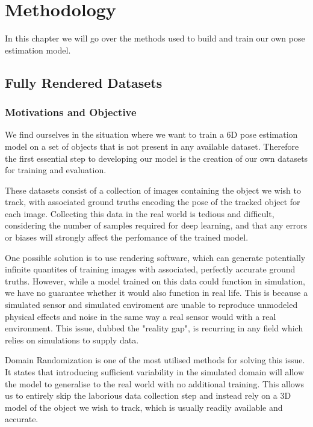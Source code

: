 \chapter{Methodology}

In this chapter we will go over the methods used to build and train our own pose estimation model.

\section{Fully Rendered Datasets}

\subsection{Motivations and Objective}

We find ourselves in the situation where we want to train a 6D pose estimation model on a set of objects that is not present in any available dataset. Therefore the first essential step to developing our model is the creation of our own datasets for training and evaluation.

These datasets consist of a collection of images containing the object we wish to track, with associated ground truths encoding the pose of the tracked object for each image. Collecting this data in the real world is tedious and difficult, considering the number of samples required for deep learning, and that any errors or biases will strongly affect the perfomance of the trained model. 

One possible solution is to use rendering software, which can generate potentially infinite quantites of training images with associated, perfectly accurate ground truths. However, while a model trained on this data could function in simulation, we have no guarantee whether it would also function in real life. This is because a simulated sensor and simulated enviroment are unable to reproduce unmodeled physical effects and noise in the same way a real sensor would with a real environment. This issue, dubbed the "reality gap"\cite{domainRandomization2}, is recurring in any field which relies on simulations to supply data.

Domain Randomization\cite{domainRandomization} is one of the most utilised methods for solving this issue. It states that introducing sufficient variability in the simulated domain will allow the model to generalise to the real world with no additional training. This allows us to entirely skip the laborious data collection step and instead rely on a 3D model of the object we wish to track, which is usually readily available and accurate.

